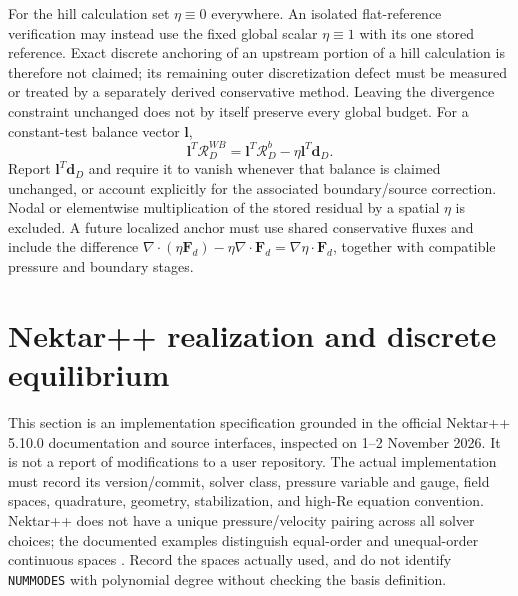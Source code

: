 \documentclass[11pt,a4paper]{article}
\numberwithin{equation}{section}
\begin{document}
For the hill calculation set $\eta\equiv0$ everywhere. An isolated
flat-reference verification may instead use the fixed global scalar
$\eta\equiv1$ with its one stored reference. Exact discrete anchoring
of an upstream portion of a hill calculation is therefore not claimed;
its remaining outer discretization defect must be measured or treated
by a separately derived conservative method. Leaving the divergence
constraint unchanged does not by itself preserve every global budget.
For a constant-test balance vector $\bm l$,
\begin{equation}
 \bm l^T\mathcal R_D^{WB}
 =\bm l^T\mathcal R_D^b-\eta\bm l^T\bm d_D.
 \label{eq:transition-eta-budget}
\end{equation}
Report $\bm l^T\bm d_D$ and require it to vanish whenever that
balance is claimed unchanged, or account explicitly for the associated
boundary/source correction. Nodal or elementwise multiplication of
the stored residual by a spatial $\eta$ is excluded. A future localized
anchor must use shared conservative fluxes and include the difference
$\nabla\cdot(\eta\bm F_d)-\eta\nabla\cdot\bm F_d
=\nabla\eta\cdot\bm F_d$, together with compatible pressure and
boundary stages.

\section{Nektar++ realization and discrete equilibrium}
\label{sec:nektar}
This section is an implementation specification grounded in the official
Nektar++ 5.10.0 documentation and source interfaces, inspected on
1--2 November 2026. It is not a report of modifications to a user repository.
The actual implementation must record its version/commit, solver class,
pressure variable and gauge, field spaces, quadrature, geometry,
stabilization, and high-Re equation convention. Nektar++ does not have
a unique pressure/velocity pairing across all solver choices; the
documented examples distinguish equal-order and unequal-order
continuous spaces \cite{NektarSpaces}. Record the spaces actually used,
and do not identify \texttt{NUMMODES} with polynomial degree without
checking the basis definition.
\end{document}
